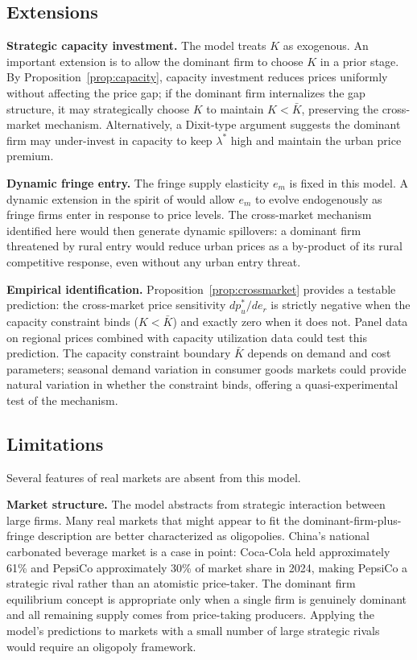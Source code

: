 \documentclass[12pt]{article}
\theoremstyle{plain}
\theoremstyle{definition}
\theoremstyle{remark}
\begin{document}
\subsection{Extensions}

\textbf{Strategic capacity investment.}  The model treats $K$ as exogenous.
An important extension is to allow the dominant firm to choose $K$ in a prior
stage.  By Proposition~\ref{prop:capacity}, capacity investment reduces prices
uniformly without affecting the price gap; if the dominant firm internalizes the
gap structure, it may strategically choose $K$ to maintain $K < \bar{K}$,
preserving the cross-market mechanism.  Alternatively, a Dixit-type
\citep{Gaskins1971} argument suggests the dominant firm may under-invest in
capacity to keep $\lambda^*$ high and maintain the urban price premium.

\textbf{Dynamic fringe entry.}  The fringe supply elasticity $e_m$ is fixed in
this model.  A dynamic extension in the spirit of \citet{Gaskins1971} would
allow $e_m$ to evolve endogenously as fringe firms enter in response to price
levels.  The cross-market mechanism identified here would then generate dynamic
spillovers: a dominant firm threatened by rural entry would reduce urban prices
as a by-product of its rural competitive response, even without any urban entry
threat.

\textbf{Empirical identification.}  Proposition~\ref{prop:crossmarket} provides
a testable prediction: the cross-market price sensitivity $dp_u^*/de_r$ is
strictly negative when the capacity constraint binds ($K < \bar{K}$) and exactly
zero when it does not.  Panel data on regional prices combined with capacity
utilization data could test this prediction.  The capacity constraint boundary
$\bar{K}$ depends on demand and cost parameters; seasonal demand variation
in consumer goods markets could provide natural variation in whether the
constraint binds, offering a quasi-experimental test of the mechanism.

\subsection{Limitations}

Several features of real markets are absent from this model.

\textbf{Market structure.}  The model abstracts from strategic interaction
between large firms.  Many real markets that might appear to fit the
dominant-firm-plus-fringe description are better characterized as oligopolies.
China's national carbonated beverage market is a case in point: Coca-Cola held
approximately 61\% and PepsiCo approximately 30\% of market share in 2024,
making PepsiCo a strategic rival rather than an atomistic price-taker.  The
dominant firm equilibrium concept is appropriate only when a single firm is
genuinely dominant and all remaining supply comes from price-taking producers.
Applying the model's predictions to markets with a small number of large
strategic rivals would require an oligopoly framework.
\end{document}
